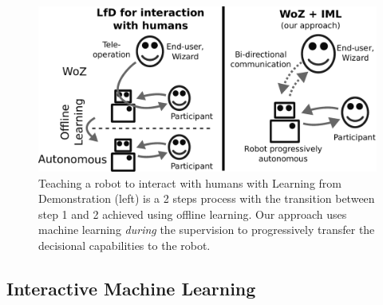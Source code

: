 \documentclass[manuscript, review, anonymous]{acmart}
\newcommand{\ES}[1]{\added[id=ES]{#1}}
\begin{document}
%	

\begin{figure}
    \centering
    \includegraphics[width=.8\columnwidth]{figs/lfd-vs-woz2}
    \caption{Teaching a robot to interact with humans with Learning from
    Demonstration (left) is a 2 steps process with the transition between step 1
    and 2 achieved using offline learning. Our approach uses machine learning
    \emph{during} the supervision to progressively transfer the decisional
    capabilities to the robot.}

    \label{fig:lfd-vs-woz}
\end{figure}

\subsection{Interactive Machine Learning}

\end{document}
